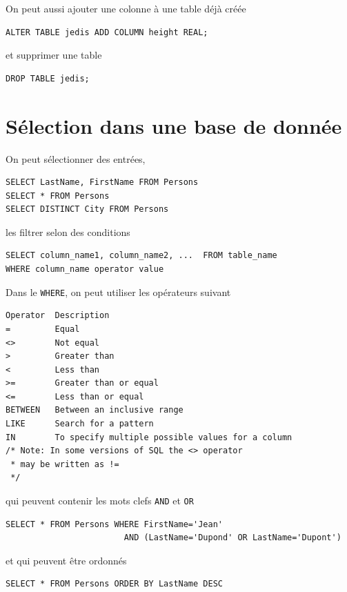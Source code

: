 On peut aussi ajouter une colonne à une table déjà créée
\begin{lstlisting}
ALTER TABLE jedis ADD COLUMN height REAL;
\end{lstlisting}
et supprimer une table
\begin{lstlisting}
DROP TABLE jedis;
\end{lstlisting}

\section{Sélection dans une base de donnée}
On peut sélectionner des entrées,
\begin{lstlisting}
SELECT LastName, FirstName FROM Persons
SELECT * FROM Persons
SELECT DISTINCT City FROM Persons
\end{lstlisting}

les filtrer selon des conditions
\begin{lstlisting}
SELECT column_name1, column_name2, ...  FROM table_name
WHERE column_name operator value
\end{lstlisting}
Dans le \lstinline|WHERE|,
on peut utiliser les opérateurs suivant
\begin{lstlisting}
Operator  Description
=         Equal
<>        Not equal
>         Greater than
<         Less than
>=        Greater than or equal
<=        Less than or equal
BETWEEN   Between an inclusive range
LIKE      Search for a pattern
IN        To specify multiple possible values for a column
/* Note: In some versions of SQL the <> operator
 * may be written as !=
 */
\end{lstlisting}

qui peuvent contenir les mots clefs \lstinline|AND| et \lstinline|OR|
\begin{lstlisting}
SELECT * FROM Persons WHERE FirstName='Jean'
                        AND (LastName='Dupond' OR LastName='Dupont')
\end{lstlisting}

et qui peuvent être ordonnés
\begin{lstlisting}
SELECT * FROM Persons ORDER BY LastName DESC
\end{lstlisting}

